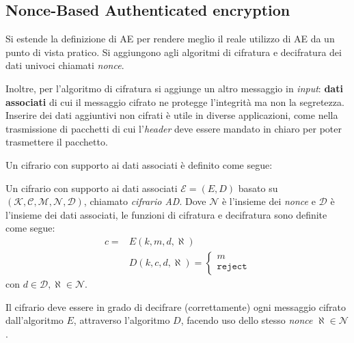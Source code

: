 \subsection{Nonce-Based Authenticated encryption}
Si estende la definizione di AE per rendere meglio il reale utilizzo di AE da un punto di vista pratico. Si aggiungono agli algoritmi di cifratura e decifratura dei dati univoci chiamati \emph{nonce}. 

Inoltre, per l'algoritmo di cifratura si aggiunge un altro messaggio in \emph{input}: \textbf{dati associati} di cui il messaggio cifrato ne protegge l'integrità ma non la segretezza. Inserire dei dati aggiuntivi non cifrati è utile in diverse applicazioni, come nella trasmissione di pacchetti di cui l'\emph{header} deve essere mandato in chiaro per poter trasmettere il pacchetto.

\vspace{1em}
Un cifrario con supporto ai dati associati è definito come segue:

\begin{definition}[Cifrario AD]
    Un cifrario con supporto ai dati associati $\mathcal{E} = (E,D)$ basato su $(\mathcal{K},\mathcal{C},\mathcal{M},\mathcal{N},\mathcal{D}) $, chiamato \emph{cifrario AD}. Dove $\mathcal{N}$ è l'insieme dei \emph{nonce} e $\mathcal{D}$ è l'insieme dei dati associati, le funzioni di cifratura e decifratura sono definite come segue:
    \begin{align*}
        c = &E(k,m,d,\aleph) \\
        &D(k,c,d,\aleph) = \begin{cases}
            m \\
            \texttt{reject}
        \end{cases}
    \end{align*}
    con $d \in \mathcal{D}, \aleph \in \mathcal{N}$.

    Il cifrario deve essere in grado di decifrare (correttamente) ogni messaggio cifrato dall'algoritmo $E$, attraverso l'algoritmo $D$, facendo uso dello stesso \emph{nonce} $\aleph \in \mathcal{N}$.
\end{definition}

